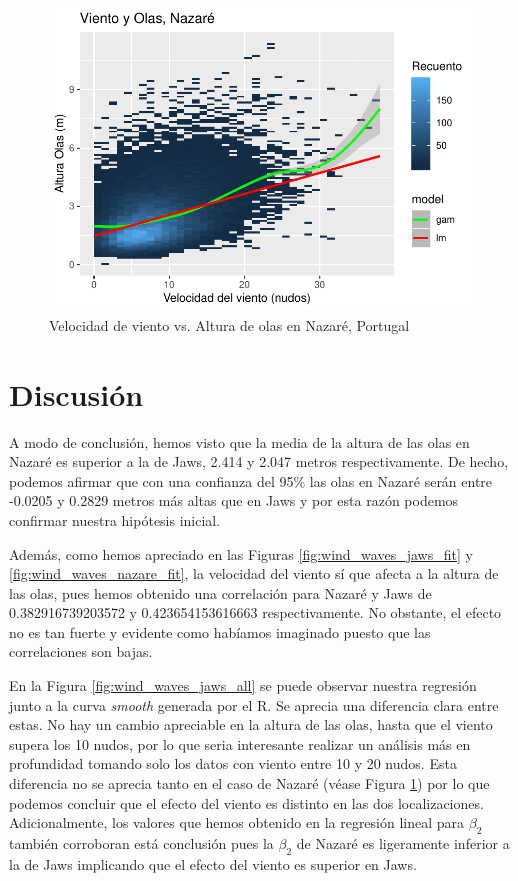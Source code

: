 \begin{figure}[H]
    \centering
    \includegraphics{./figures/nazare_all.pdf}
    \caption{Velocidad de viento vs. Altura de olas en Nazaré, Portugal}
    \label{fig:wind_waves_nazare_all}
\end{figure}

\section{Discusión}%
\label{sec:discusión}

A modo de conclusión, hemos visto que la media de la altura de las olas en Nazaré es superior a la de Jaws,
2.414 y 2.047 metros respectivamente. De hecho, podemos afirmar que con una confianza del 95\% las olas en
Nazaré serán entre -0.0205 y 0.2829 metros más altas que en Jaws y por esta razón podemos confirmar
nuestra hipótesis inicial.

Además, como hemos apreciado en las Figuras \ref{fig:wind_waves_jaws_fit} y \ref{fig:wind_waves_nazare_fit}, la velocidad del viento sí que afecta a la altura de las olas, pues hemos obtenido una correlación para Nazaré y Jaws de 0.382916739203572 y 0.423654153616663 respectivamente. No obstante, el efecto no es tan fuerte y evidente como habíamos imaginado puesto que las correlaciones son bajas.

En la Figura \ref{fig:wind_waves_jaws_all} se puede observar nuestra regresión junto a la
curva \emph{smooth} generada por el R. Se aprecia una diferencia clara entre estas.
No hay un cambio apreciable en la altura de las olas, hasta que el viento supera los 10 nudos, por lo que
seria interesante realizar un análisis más en profundidad tomando solo los datos con viento entre 10 y 20 nudos.
Esta diferencia no se aprecia tanto en el caso de Nazaré (véase Figura \ref{fig:wind_waves_nazare_all}) por lo que 
podemos concluir que el efecto del viento es distinto en las dos localizaciones. Adicionalmente, los valores que hemos obtenido en la regresión lineal para \(\beta_2\) también corroboran está conclusión pues la \(\beta_2\) de Nazaré es ligeramente inferior a la de Jaws implicando que el efecto del viento es superior en Jaws.


